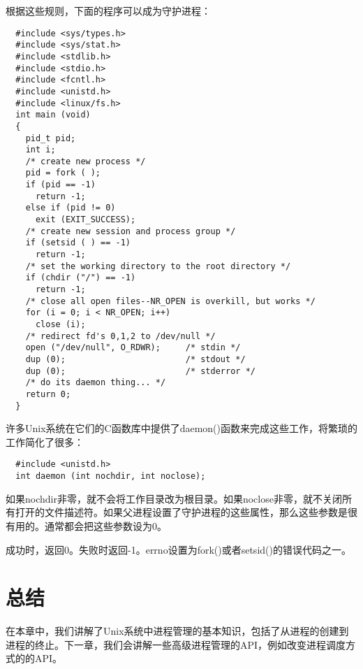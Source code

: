 根据这些规则，下面的程序可以成为守护进程：

\begin{lstlisting}
  #include <sys/types.h>
  #include <sys/stat.h>
  #include <stdlib.h>
  #include <stdio.h>
  #include <fcntl.h>
  #include <unistd.h>
  #include <linux/fs.h>
  int main (void)
  {
    pid_t pid;
    int i;
    /* create new process */
    pid = fork ( );
    if (pid == -1)
      return -1;
    else if (pid != 0)
      exit (EXIT_SUCCESS);
    /* create new session and process group */
    if (setsid ( ) == -1)
      return -1;
    /* set the working directory to the root directory */
    if (chdir ("/") == -1)
      return -1;
    /* close all open files--NR_OPEN is overkill, but works */
    for (i = 0; i < NR_OPEN; i++)
      close (i);
    /* redirect fd's 0,1,2 to /dev/null */
    open ("/dev/null", O_RDWR);     /* stdin */
    dup (0);                        /* stdout */
    dup (0);                        /* stderror */
    /* do its daemon thing... */
    return 0;
  }
\end{lstlisting}

许多Unix系统在它们的C函数库中提供了daemon()函数来完成这些工作，将繁琐的工作简化了很多：

\begin{lstlisting}
  #include <unistd.h>
  int daemon (int nochdir, int noclose);
\end{lstlisting}

如果nochdir非零，就不会将工作目录改为根目录。如果noclose非零，就不关闭所有打开的文件描述符。如果父进程设置了守护进程的这些属性，那么这些参数是很有用的。通常都会把这些参数设为0。

成功时，返回0。失败时返回-1。errno设置为fork()或者setsid()的错误代码之一。

\section{总结}

在本章中，我们讲解了Unix系统中进程管理的基本知识，包括了从进程的创建到进程的终止。下一章，我们会讲解一些高级进程管理的API，例如改变进程调度方式的的API。
